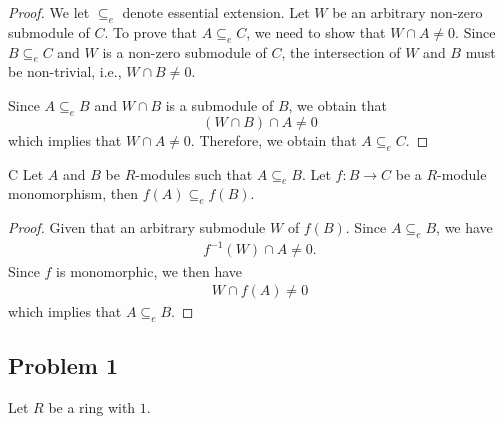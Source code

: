 \begin{proof}
    We let $\subseteq_e$ denote essential extension.
    Let $W$ be an arbitrary non-zero submodule of $C$. To prove that $A \subseteq_e C$, we need to show that $W \cap A \neq 0$.
    Since $B \subseteq_e C$ and $W$ is a non-zero submodule of $C$, the intersection of $W$ and $B$ must be non-trivial, i.e., $W \cap B \neq 0$. 

    Since $A\subseteq_e B$ and $W \cap B$ is a submodule of $B$, we obtain that 
    \[ (W \cap B) \cap A \neq 0 \]
    which implies that $W\cap A \neq 0$. Therefore, we obtain that $A\subseteq_e C$.
\end{proof}

\begin{lemma}{C}
    Let $A$ and $B$ be $R$-modules such that $A \subseteq_e B$. Let $f:B\to C$ be a $R$-module monomorphism, then $f(A)\subseteq_e f(B)$.
\end{lemma}
\begin{proof}
    Given that an arbitrary submodule $W$ of $f(B)$. Since $A\subseteq_e B$, we have
    \begin{align*}
        f^{-1}(W)\cap A \neq 0.
    \end{align*}
    Since $f$ is monomorphic, we then have 
        \begin{align*}
        W\cap f(A) \neq 0
    \end{align*}
    which implies that $A\subseteq_e B$.
\end{proof}


\subsection*{Problem 1}

Let $R$ be a ring with $1$.

